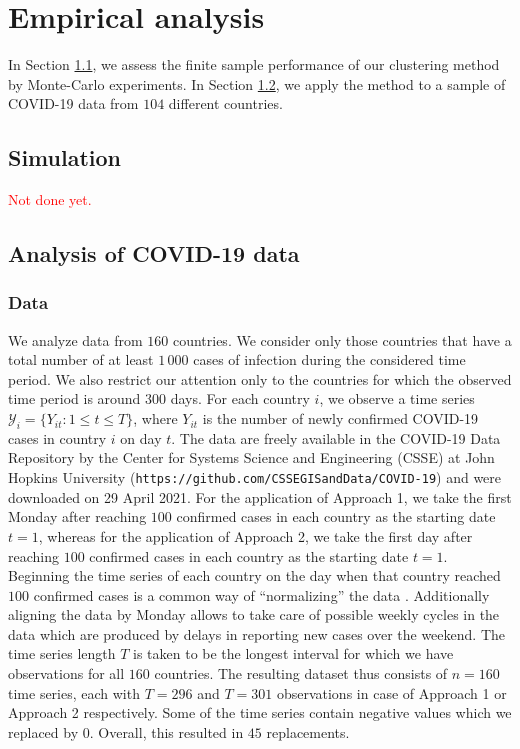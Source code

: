\documentclass[a4paper,12pt]{article}
\numberwithin{equation}{section}
\begin{document}
\newpage
\section{Empirical analysis}\label{sec:app}


In Section \ref{subsec:sim}, we assess the finite sample performance of our clustering method by Monte-Carlo experiments. In Section \ref{subsec:app}, we apply the method to a sample of COVID-19 data from $104$ different countries. 



\subsection{Simulation}\label{subsec:sim}


\textcolor{red}{Not done yet.} 


\subsection{Analysis of COVID-19 data}\label{subsec:app}

\subsubsection{Data}


We analyze data from $160$ countries. We consider only those countries that have a total number of at least $1\,000$ cases of infection during the considered time period. We also restrict our attention only to the countries for which the observed time period is around $300$ days. For each country $i$, we observe a time series $\mathcal{Y}_i = \{ Y_{it}: 1 \le t \le T \}$, where $Y_{it}$ is the number of newly confirmed COVID-19 cases in country $i$ on day $t$. The data are freely available in the COVID-19 Data Repository by the Center for Systems Science and Engineering (CSSE) at John Hopkins University (\texttt{https://github.com/CSSEGISandData/COVID-19}) and were downloaded on 29 April 2021. For the application of Approach 1, we take the first Monday after reaching $100$ confirmed cases in each country as the starting date $t=1$, whereas for the application of Approach 2, we take the first day after reaching $100$ confirmed cases in each country as the starting date $t=1$.
Beginning the time series of each country on the day when that country reached $100$ confirmed cases is a common way of ``normalizing'' the data \citep[see e.g.][]{Cohen2020}. Additionally aligning the data by Monday allows to take care of possible weekly cycles in the data which are produced by delays in reporting new cases over the weekend. 
The time series length $T$ is taken to be the longest interval for which we have observations for all $160$ countries. The resulting dataset thus consists of $n = 160$ time series, each with $T = 296$ and $T = 301$ observations in case of Approach 1 or Approach 2 respectively. Some of the time series contain negative values which we replaced by $0$. Overall, this resulted in $45$ replacements.
\end{document}

